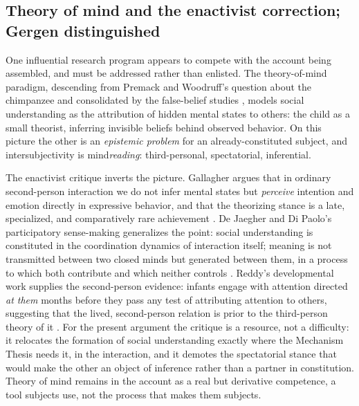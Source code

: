 \subsection{Theory of mind and the enactivist correction; Gergen distinguished}
\label{p05:sec:gergen}

One influential research program appears to compete with the account being assembled, and must be addressed rather than enlisted. The theory-of-mind paradigm, descending from Premack and Woodruff's question about the chimpanzee \parencite{premack1978} and consolidated by the false-belief studies \parencite{baroncohen1985}, models social understanding as the attribution of hidden mental states to others: the child as a small theorist, inferring invisible beliefs behind observed behavior. On this picture the other is an \emph{epistemic problem} for an already-constituted subject, and intersubjectivity is mind\emph{reading}: third-personal, spectatorial, inferential.

The enactivist critique inverts the picture. Gallagher argues that in ordinary second-person interaction we do not infer mental states but \emph{perceive} intention and emotion directly in expressive behavior, and that the theorizing stance is a late, specialized, and comparatively rare achievement \parencite{gallagher2008}. De Jaegher and Di Paolo's participatory sense-making generalizes the point: social understanding is constituted in the coordination dynamics of interaction itself; meaning is not transmitted between two closed minds but generated between them, in a process to which both contribute and which neither controls \parencite{dejaegher2007}. Reddy's developmental work supplies the second-person evidence: infants engage with attention directed \emph{at them} months before they pass any test of attributing attention to others, suggesting that the lived, second-person relation is prior to the third-person theory of it \parencite{reddy2008}. For the present argument the critique is a resource, not a difficulty: it relocates the formation of social understanding exactly where the Mechanism Thesis needs it, in the interaction, and it demotes the spectatorial stance that would make the other an object of inference rather than a partner in constitution. Theory of mind remains in the account as a real but derivative competence, a tool subjects use, not the process that makes them subjects.

